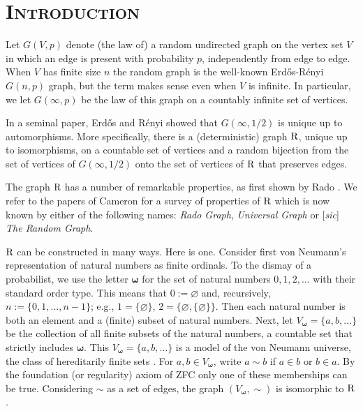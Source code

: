 \documentclass[reqno]{amsart}
\theoremstyle{theorem}
\theoremstyle{definition}
\theoremstyle{remark}
\newcommand{\1}{{\text{\Large $\mathfrak 1$}}}	%
\numberwithin{equation}{section}
\def\bomega{{\boldsymbol\omega}}
\def\Rado{\text{\textsf{\textbf{R}}}}
\begin{document}
\maketitle 

\hypersetup{linkcolor=Brown}
\tableofcontents


\section{\bfseries\scshape  Introduction}
Let $G(V,p)$ denote (the law of) a random undirected graph on the vertex set
$V$ in which an edge is present with probability $p$, 
independently from edge to edge.
When $V$ has finite size $n$ the random graph
is the well-known Erd\H{o}s-R\'enyi $G(n,p)$ graph,
but the term makes sense even when $V$ is infinite.
In particular, we let $G(\infty, p)$ be the law of this graph on a countably
infinite set of vertices. 

In a seminal paper, Erd\H{o}s and R\'enyi \cite{ER63} showed that
$G(\infty,1/2)$ is unique up to automorphisms.
More specifically, there is a (deterministic) graph $\Rado$,
unique up to isomorphisms, on a countable set of vertices and a
random bijection from the set of vertices of $G(\infty,1/2)$ 
onto the set of vertices of $\Rado$ that preserves edges. 

The graph $\Rado$ has a number of remarkable properties, as first shown by Rado
\cite{R64}. We refer to the papers of Cameron \cite{CAM97,CAM01}
for a survey of properties of $\Rado$ which
is now known by either of the following names:
{\em Rado Graph}, 
{\em Universal Graph} or [{\em sic}] {\em The Random Graph}.

$\Rado$ can be constructed in many ways. Here is one. 
Consider first von Neumann's representation of natural numbers
as finite ordinals. To the dismay of a probabilist, we use the
letter $\bomega$ for the set of natural numbers $0,1,2,\ldots$
with their standard order type.
This means that $0:=\varnothing$ and, recursively, $n := \{0,1,\ldots, n-1\}$; 
e.g., $1=\{\varnothing\}$, $2=\{\varnothing, \{\varnothing\}\}$.
Then each natural number is both an element and a (finite) 
subset of natural numbers.
Next, let $V_\bomega=\{a,b,\ldots\}$ be the collection of 
all finite subsets of the natural numbers, a countable
set that strictly includes $\bomega$.
This $V_\bomega=\{a,b,\ldots\}$ is a model of the von Neumann universe,
the class of hereditarily finite sets \cite{ENDERTON}.
For $a, b \in V_\bomega$, write $a \sim b$ if 
$a \in b$ or $b \in a$.
By the foundation (or regularity) axiom of ZFC \cite{ENDERTON} 
only one of these memberships can be true.
Considering $\sim$ as a set of edges, the graph $(V_\bomega, \sim)$ is
isomorphic to $\Rado$.
\end{document}
